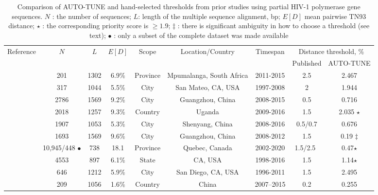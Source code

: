 \documentclass[utf8]{FrontiersinHarvard} %
\begin{document}
\begin{table}[h]
	\caption{Comparison of AUTO-TUNE and hand-selected thresholds from prior studies using partial HIV-1 polymerase gene sequences. $N$ : the number of sequences; $L$: length of the multiple sequence alignment, bp; $E[D]$ mean pairwise TN93 distance; $\star$ : the corresponding priority score is $\geq 1.9$; $\ddag$ : there is significant ambiguity in how to choose a threshold (see text); $\bullet$ : only a subset of the complete dataset was made available}
	\vspace{10pt}
	\centering
	\begin{ssmall}
	\label{tab:paperComparison}
	\begin{tabular}{ccccccccc}
	   \hline
		Reference     & $N$ & $L$ & $E[D]$ & Scope & Location/Country      & Timespan & \multicolumn{2}{c}{Distance threshold, \%}\\
		     &  &       &  &  & & & Published & AUTO-TUNE \\
		\hline
		\citet{sivay_hiv-1_2018} & 201 & 1302 & 6.9\% & Province & Mpumalanga, South Africa & 2011-2015       & 2.5          &2.467   \\
		\cite{dalai_combining_2018} & 317 & 1044 & 5.5\% & City & San Mateo, CA, USA          & 1997-2008       & 2            & 1.944   \\
		\cite{h_acquisition_2021} & 2786 & 1569 & 9.2\% & City & Guangzhou, China        & 2008-2015       & 0.5          & 0.716   \\
		\cite{bbosa_short_2020} &2018 &  1257 & 9.3\% & Country  & Uganda       & 2009-2016       & 1.5          & 2.035 $\star$  \\
		\cite{liu_dynamics_2020}  & 1907 & 1053 & 5.3\% & City & Shenyang, China        & 2008-2016       &  0.5/0.7   & 0.676  \\
		\cite{h_acquisition_2021} & 1693 &1569&  9.6\%& City & Guangzhou, China        & 2008-2012       & 1.5          & 0.19  $\ddag$   \\
		\cite{brenner_role_2021}  & 10,945/448 $\bullet$ & 738 & 18.1& Province & Quebec, Canada       & 2002-2020       & 1.5/2.5\    & 0.47$\star$   \\
		\cite{rhee_national_2019} & 4553 & 897& 6.1\% & State & CA, USA          & 1998-2016       & 1.5          & 1.14$\star$   \\
		\cite{Little:2014aa} & 646 & 1212 & 5.9\%& City & San Diego, CA, USA & 1996-2011 &  1.5 &  2.495\\
		\cite{Zai:2020aa} & 209 & 1056 & 1.6\% & Country & China & 2007–2015 & 0.2 & 0.255 \\

\end{tabular}
\end{ssmall}
\end{table}
\end{document}
